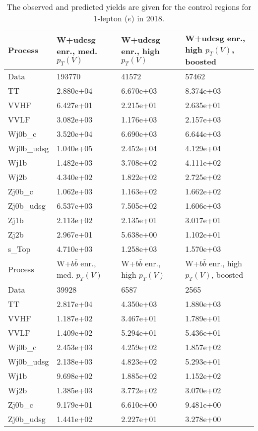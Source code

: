\begin{table}
\centering
\caption[2018 1-lepton ($e$) control region yields]{
                  The observed and predicted yields are given for the
                  control regions for 1-lepton ($e$) in 2018.
                  }
{\footnotesize
\begin{tabularx}{0.8\textwidth}{|X|X|X|X|}
\hline
Process & W+udcsg enr., med. $p_{T}(V)$ & W+udcsg enr., high $p_{T}(V)$ & W+udcsg enr., high $p_{T}(V)$, boosted \\
\hline
Data & 193770 & 41572 & 57462 \\
\hline
TT & 2.880e+04 & 6.670e+03 & 8.374e+03 \\
VVHF & 6.427e+01 & 2.215e+01 & 2.635e+01 \\
VVLF & 3.082e+03 & 1.176e+03 & 2.157e+03 \\
Wj0b\_c & 3.520e+04 & 6.690e+03 & 6.644e+03 \\
Wj0b\_udsg & 1.040e+05 & 2.452e+04 & 4.129e+04 \\
Wj1b & 1.482e+03 & 3.708e+02 & 4.111e+02 \\
Wj2b & 4.340e+02 & 1.822e+02 & 2.725e+02 \\
Zj0b\_c & 1.062e+03 & 1.163e+02 & 1.662e+02 \\
Zj0b\_udsg & 6.537e+03 & 7.505e+02 & 1.606e+03 \\
Zj1b & 2.113e+02 & 2.135e+01 & 3.017e+01 \\
Zj2b & 2.967e+01 & 5.638e+00 & 1.102e+01 \\
s\_Top & 4.710e+03 & 1.258e+03 & 1.570e+03 \\
\hline
\hline
Process & W+$b\bar{b}$ enr., med. $p_{T}(V)$ & W+$b\bar{b}$ enr., high $p_{T}(V)$ & W+$b\bar{b}$ enr., high $p_{T}(V)$, boosted \\
\hline
Data & 39928 & 6587 & 2565 \\
\hline
TT & 2.817e+04 & 4.350e+03 & 1.880e+03 \\
VVHF & 1.187e+02 & 3.467e+01 & 1.789e+01 \\
VVLF & 1.409e+02 & 5.294e+01 & 5.436e+01 \\
Wj0b\_c & 2.453e+03 & 4.259e+02 & 1.857e+02 \\
Wj0b\_udsg & 2.138e+03 & 4.823e+02 & 5.293e+01 \\
Wj1b & 9.698e+02 & 1.885e+02 & 1.152e+02 \\
Wj2b & 1.385e+03 & 3.772e+02 & 3.070e+02 \\
Zj0b\_c & 9.179e+01 & 6.610e+00 & 9.481e+00 \\
Zj0b\_udsg & 1.441e+02 & 2.227e+01 & 3.278e+00 \\

\end{tabularx}}
\end{table}
